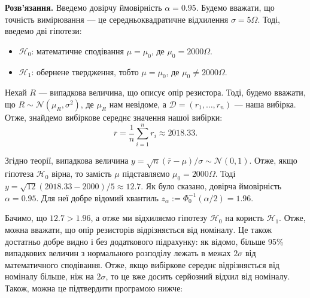 \documentclass{../hw_template}
\begin{document}
\textbf{Розв'язання.} Введемо довірчу ймовірність $\alpha=0.95$. Будемо вважати, що
точність вимірювання --- це середньоквадратичне відхилення $\sigma=5\Omega$. Тоді, введемо дві гіпотези:
\begin{itemize}
    \item $\mathcal{H}_0$: математичне сподівання $\mu=\mu_0$, де $\mu_0=2000\Omega$.
    \item $\mathcal{H}_1$: обернене твердження, тобто $\mu=\mu_0$, де $\mu_0\neq 2000\Omega$.
\end{itemize}

Нехай $R$ --- випадкова величина, що описує опір резистора. Тоді, будемо вважати, що $R \sim \mathcal{N}(\mu_R,\sigma^2)$, де $\mu_R$ нам невідоме, а $\mathcal{D}=(r_1,\dots,r_n)$ --- наша вибірка. Отже, знайдемо вибіркове середнє значення нашої вибірки:
\begin{equation*}
    \overline{r} = \frac{1}{n}\sum_{i=1}^n r_i \approx 2018.33.
\end{equation*}

Згідно теорії, випадкова величина $y=\sqrt{n}(\overline{r}-\mu)/\sigma \sim \mathcal{N}(0,1)$. Отже, якщо гіпотеза $\mathcal{H}_0$ вірна, то замість $\mu$ підставляємо $\mu_0=2000\Omega$. Тоді $y=\sqrt{12}(2018.33-2000)/5 \approx 12.7$. Як було сказано, довірча ймовірність $\alpha=0.95$. Для неї добре відомий квантиль $z_{\alpha} := \Phi_0^{-1}(\alpha/2) = 1.96$. 

Бачимо, що $12.7 > 1.96$, а отже ми відхиляємо гіпотезу $\mathcal{H}_0$ на користь $\mathcal{H}_1$. Отже, можна вважати, що опір резисторів відрізняється від номіналу. Це також достатньо добре видно і без додаткового підрахунку: як відомо, більше 95\% випадкових величин з нормального розподілу лежать в межах $2\sigma$ від математичного сподівання. Отже, якщо вибіркове середнє відрізняється від номіналу більше, ніж на $2\sigma$, то це вже досить серйозний відхил від номіналу. Також, можна це підтвердити програмою нижче:
\end{document}
